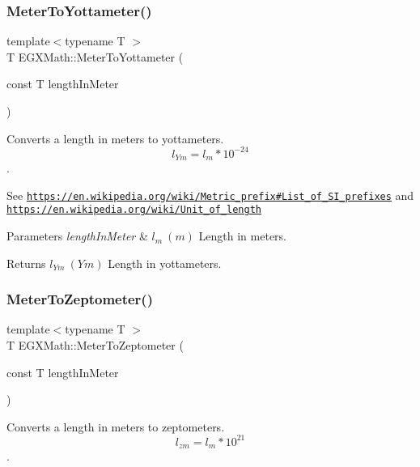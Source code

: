 \subsubsection{\texorpdfstring{Meter\+To\+Yottameter()}{MeterToYottameter()}}
{\footnotesize\ttfamily template$<$typename T $>$ \\
T E\+G\+X\+Math\+::\+Meter\+To\+Yottameter (\begin{DoxyParamCaption}\item[{const T}]{length\+In\+Meter }\end{DoxyParamCaption})}



Converts a length in meters to yottameters. \[ l_{Ym}=l_{m} * 10^{-24} \]. 

See \href{https://en.wikipedia.org/wiki/Metric_prefix#List_of_SI_prefixes}{\tt https\+://en.\+wikipedia.\+org/wiki/\+Metric\+\_\+prefix\#\+List\+\_\+of\+\_\+\+S\+I\+\_\+prefixes} and \href{https://en.wikipedia.org/wiki/Unit_of_length}{\tt https\+://en.\+wikipedia.\+org/wiki/\+Unit\+\_\+of\+\_\+length} 
\begin{DoxyParams}{Parameters}
{\em length\+In\+Meter} & $ l_{m}\ (m)$ Length in meters. \\
\hline
\end{DoxyParams}
\begin{DoxyReturn}{Returns}
$ l_{Ym}\ (Ym)$ Length in yottameters. 
\end{DoxyReturn}
\mbox{\label{group___e_g_x_math-_conversions-_length_conversions-_s_i-_meter-_s_i_ga865c00bc3abce82de30d18022f460a5c}} 
\subsubsection{\texorpdfstring{Meter\+To\+Zeptometer()}{MeterToZeptometer()}}
{\footnotesize\ttfamily template$<$typename T $>$ \\
T E\+G\+X\+Math\+::\+Meter\+To\+Zeptometer (\begin{DoxyParamCaption}\item[{const T}]{length\+In\+Meter }\end{DoxyParamCaption})}



Converts a length in meters to zeptometers. \[ l_{zm}=l_{m} * 10^{21} \]. 

